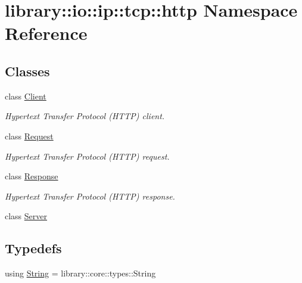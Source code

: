 \hypertarget{namespacelibrary_1_1io_1_1ip_1_1tcp_1_1http}{}\section{library\+:\+:io\+:\+:ip\+:\+:tcp\+:\+:http Namespace Reference}
\label{namespacelibrary_1_1io_1_1ip_1_1tcp_1_1http}
\subsection*{Classes}
\begin{DoxyCompactItemize}
\item 
class \hyperlink{classlibrary_1_1io_1_1ip_1_1tcp_1_1http_1_1_client}{Client}
\begin{DoxyCompactList}\small\item\em Hypertext Transfer Protocol (H\+T\+TP) client. \end{DoxyCompactList}\item 
class \hyperlink{classlibrary_1_1io_1_1ip_1_1tcp_1_1http_1_1_request}{Request}
\begin{DoxyCompactList}\small\item\em Hypertext Transfer Protocol (H\+T\+TP) request. \end{DoxyCompactList}\item 
class \hyperlink{classlibrary_1_1io_1_1ip_1_1tcp_1_1http_1_1_response}{Response}
\begin{DoxyCompactList}\small\item\em Hypertext Transfer Protocol (H\+T\+TP) response. \end{DoxyCompactList}\item 
class \hyperlink{classlibrary_1_1io_1_1ip_1_1tcp_1_1http_1_1_server}{Server}
\end{DoxyCompactItemize}
\subsection*{Typedefs}
\begin{DoxyCompactItemize}
\item 
using \hyperlink{namespacelibrary_1_1io_1_1ip_1_1tcp_1_1http_a1c435ea1e3614d52139da88a36632815}{String} = library\+::core\+::types\+::\+String
\end{DoxyCompactItemize}
